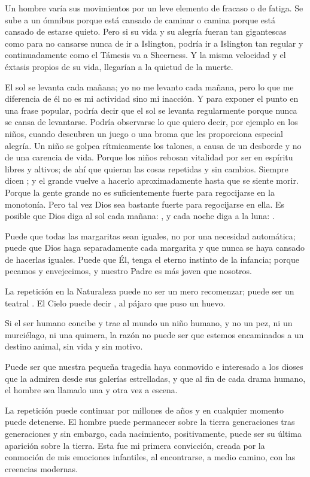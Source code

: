 Un hombre varía sus movimientos por un leve elemento de fracaso o de fatiga. Se sube a un
ómnibus porque está cansado de caminar o camina porque está cansado de estarse quieto. Pero si su vida
y su alegría fueran tan gigantescas como para no cansarse nunca de ir a Islington, podría ir a Islington tan
regular y continuadamente como el Támesis va a Sheerness. Y la misma velocidad y el éxtasis propios de
su vida, llegarían a la quietud de la muerte.

El sol se levanta cada mañana; yo no me levanto cada mañana, pero lo que me diferencia de él no es
mi actividad sino mi inacción. Y para exponer el punto en una frase popular, podría decir que el sol se
levanta regularmente porque nunca se cansa de levantarse. Podría observarse lo que quiero decir, por
ejemplo en los niños, cuando descubren un juego o una broma que les proporciona especial alegría. Un
niño se golpea rítmicamente los talones, a causa de un desborde y no de una carencia de vida. Porque los
niños rebosan vitalidad por ser en espíritu libres y altivos; de ahí que quieran las cosas repetidas y sin
cambios. Siempre dicen ; y el grande vuelve a hacerlo aproximadamente hasta que se
siente morir. Porque la gente grande no es suficientemente fuerte para regocijarse en la monotonía. Pero
tal vez Dios sea bastante fuerte para regocijarse en ella. Es posible que Dios diga al sol cada mañana:
, y cada noche diga a la luna: .

Puede que todas las margaritas sean iguales, no por una necesidad automática; puede que Dios haga
separadamente cada margarita y que nunca se haya cansado de hacerlas iguales. Puede que Él, tenga el
eterno instinto de la infancia; porque pecamos y envejecimos, y nuestro Padre es más joven que nosotros.

La repetición en la Naturaleza puede no ser un mero recomenzar; puede ser un teatral . El Cielo
puede decir , al pájaro que puso un huevo.

Si el ser humano concibe y trae al mundo un niño humano, y no un pez, ni un murciélago, ni una
quimera, la razón no puede ser que estemos encaminados a un destino animal, sin vida y sin motivo.

Puede ser que nuestra pequeña tragedia haya conmovido e interesado a los dioses que la admiren desde
sus galerías estrelladas, y que al fin de cada drama humano, el hombre sea llamado una y otra vez a
escena.

La repetición puede continuar por millones de años y en cualquier momento puede detenerse. El
hombre puede permanecer sobre la tierra generaciones tras generaciones y sin embargo, cada nacimiento,
positivamente, puede ser su última aparición sobre la tierra. Esta fue mi primera convicción, creada por la
conmoción de mis emociones infantiles, al encontrarse, a medio camino, con las creencias modernas.

